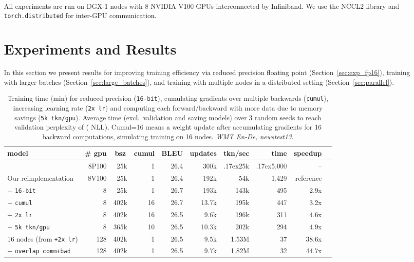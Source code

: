 \documentclass[11pt,a4paper]{article}
\newcommand{\customtilde}{\raise.17ex\hbox{}}
\begin{document}
All experiments are run on DGX-1 nodes with 8 NVIDIA\textsuperscript{\textcopyright} V100 GPUs interconnected by Infiniband. We use the NCCL2 library and \texttt{torch.distributed} for inter-GPU communication.

\section{Experiments and Results}\label{sec:results}

In this section we present results for improving training efficiency via reduced precision floating point (Section~\ref{sec:exp_fp16}), training with larger batches (Section~\ref{sec:large_batches}), and training with multiple nodes in a distributed setting (Section~\ref{sec:parallel}).

\begin{table*}
\centering
\begin{tabular}{l | r r r | r r r r r r}
\toprule
model & \# gpu &
\multicolumn{1}{c}{bsz} 
 & {\small cumul} & BLEU & updates & tkn/sec & time & speedup \\
\hline
\citet{vaswani2017transformer} & {\small 8P100} & 25k  & 1 &  26.4  & 300k & \customtilde 25k & \customtilde 5,000 & --\\
\hline
Our reimplementation & {\small 8V100} & 25k  & 1 &  26.4  & 192k & 54k & 1,429 & {\small reference}\\
\hline
+ \texttt{16-bit} &8& 25k  & 1 &  26.7  & 193k & 143k & 495 & 2.9x \\
+ \texttt{cumul} &8& 402k  & 16 &  26.7 &  13.7k & 195k & 447 & 3.2x\\
+ \texttt{2x lr}  &8& 402k  & 16  &  26.5 & 9.6k & 196k & 311 & 4.6x \\
+ \texttt{5k tkn/gpu}  &8& 365k & 10 & 26.5 & 10.3k & 202k & 294 & 4.9x \\
\hline
16 nodes (from {\tt +2x\,lr}) & 128 & 402k & 1 & 26.5 & 9.5k & 1.53M & 37 & 38.6x \\
+ \texttt{overlap comm+bwd} & 128 & 402k & 1 & 26.5 & 9.7k & 1.82M & 32 & 44.7x \\
\bottomrule
\end{tabular}
\caption{Training time (min) for reduced precision (\texttt{16-bit}), cumulating gradients over multiple backwards (\texttt{cumul}), increasing learning rate (\texttt{2x lr})
and computing each forward/backward with more data due to memory savings (\texttt{5k tkn/gpu}).
Average time (excl.~validation and saving models) over 3 random seeds to reach validation perplexity of  ( NLL).
Cumul=16 means a weight update after accumulating gradients for 16 backward computations, simulating training on 16 nodes.
\emph{WMT En-De, newstest13}.
}
\label{tab:speed}
\end{table*}
\end{document}
